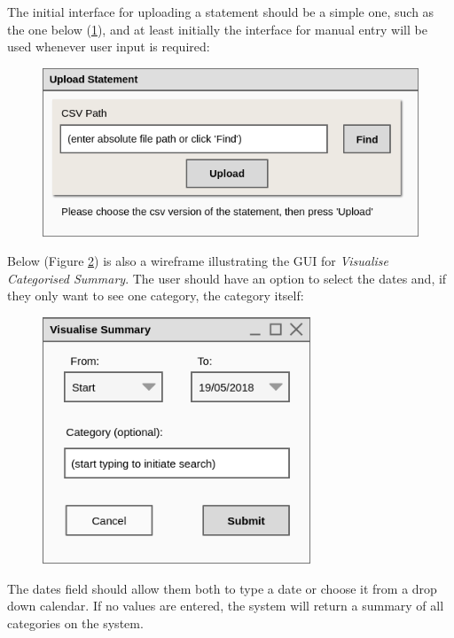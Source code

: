 The initial interface for uploading a statement should be a simple one, such as
the one below
(\ref{fig:Wireframe.UploadStatement}), and at least initially the interface for
manual entry will be used whenever user input is required:
\begin{figure}[ht!]
  \begin{center}
    \includegraphics[width=12cm]{./contents/img/Wireframe_-_Upload_Statement.png}
  \end{center}
  \caption{}
  \label{fig:Wireframe.UploadStatement}
\end{figure}
\FloatBarrier

Below (Figure \ref{fig:Wireframe.VisualiseCategorisedSummary}) is also a
wireframe illustrating the GUI for \emph{Visualise Categorised Summary}. The
user should have an option to select the dates and, if they only want to see
one category, the category itself:
\begin{figure}[ht!]
  \begin{center}
    \includegraphics[width=8cm]{./contents/img/Wireframe_-_Visualise_Summary.png}
  \end{center}
  \caption{}
  \label{fig:Wireframe.VisualiseCategorisedSummary}
\end{figure}
\FloatBarrier

The dates field should allow them both to type a date or choose it from a drop
down calendar. If no values are entered, the system will return a summary of
all categories on the system.



